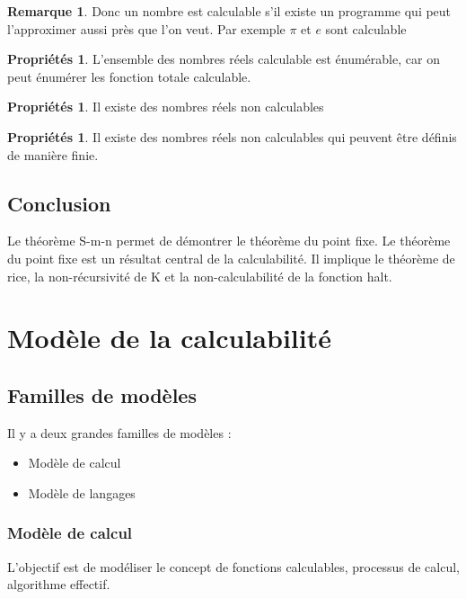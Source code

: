 \documentclass[11pt,a4paper]{article}
\theoremstyle{definition}
\newtheorem{myprop}[mydef]{Propriétés}
\newtheorem{myrem}[mydef]{Remarque}
\begin{document}
\begin{myrem}
	Donc un nombre est calculable s'il existe un programme qui peut 
	l'approximer aussi près que l'on veut. Par exemple $\pi$ et $e$ sont 
	calculable
\end{myrem}

\begin{myprop}
	L'ensemble des nombres réels calculable est énumérable, car on peut énumérer les 
	fonction totale calculable.	
\end{myprop}

\begin{myprop}
	Il existe des nombres réels non calculables
\end{myprop}

\begin{myprop}
	Il existe des nombres réels non calculables qui peuvent être définis de 
	manière finie.
\end{myprop}


\subsection{Conclusion}

Le théorème S-m-n permet de démontrer le théorème du point fixe.
Le théorème du point fixe est un résultat central de la calculabilité. Il 
implique le théorème de rice, la non-récursivité de K et la non-calculabilité 
de la fonction halt.


\section{Modèle de la calculabilité}
\label{sec:mod_le_de_la_calculabilit_}

\subsection{Familles de modèles}
\label{sub:fammilles_de_mod_les}

Il y a deux grandes familles de modèles :
\begin{itemize}
	\item Modèle de calcul
	\item Modèle de langages
\end{itemize}

\subsubsection{Modèle de calcul}
\label{ssub:mod_le_de_calcul}
L'objectif est de modéliser le concept de fonctions calculables, processus de 
calcul, algorithme effectif.
\end{document}
